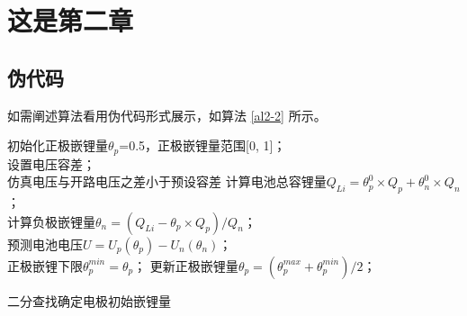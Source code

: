 \chapter{这是第二章}

\section{伪代码}
如需阐述算法看用伪代码形式展示，如算法 \ref{al2-2} 所示。

\begin{algorithm}[H]
    \SetAlgoNoLine %
    \BlankLine
    初始化正极嵌锂量$\theta_p$=0.5，正极嵌锂量范围[0, 1]；\\ %
    设置电压容差；\\
    \Repeat
        {仿真电压与开路电压之差小于预设容差}
        {计算电池总容锂量$Q_{Li}=\theta_p^0 \times Q_p+\theta_n^0 \times Q_n$；\\
        计算负极嵌锂量$\theta_n=(Q_{Li}-\theta_p \times Q_p)/Q_n$；\\
        预测电池电压$U=U_p(\theta_p)-U_n(\theta_n)$；\\
        {正极嵌锂下限$\theta_p^{min}=\theta_p$；}	
        更新正极嵌锂量$\theta_p=(\theta_p^{max}+\theta_p^{min})/2$；\\
        }
    \caption{二分查找确定电极初始嵌锂量\label{al2-2}}
\end{algorithm}

